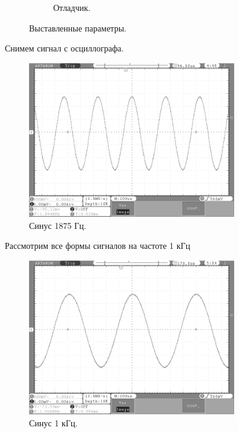 \begin{figure}[H]
\begin{subfigure}[H]{0.5\textwidth}
         \caption{Отладчик.}
     \end{subfigure}
        \caption{Выставленные параметры.}
	\end{figure}
	
	Снимем сигнал с осциллографа.
	\begin{figure}[H]
    \centering
    \includegraphics[width=0.8\textwidth]{../image/1875.bmp}
    \caption{Синус 1875 Гц.}
	\end{figure}	
	
	Рассмотрим все формы сигналов на частоте 1 кГц

	\begin{figure}[H]
    \centering
    \includegraphics[width=0.8\textwidth]{../image/sin1.bmp}
    \caption{Синус 1 кГц.}
	\end{figure}	
	
